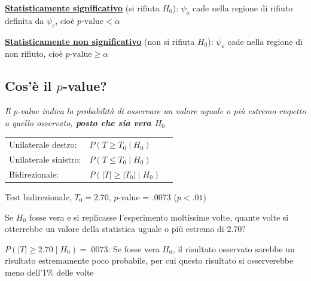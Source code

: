 \documentclass[
  ignorenonframetext,
  compress, aspectratio=149]{beamer}
\begin{document}
\begin{frame}{}
\begin{tcolorbox}
\textbf{\underline{Statisticamente significativo}} (si rifiuta \(H_0\)):
\(\psi_o\) cade nella regione di rifiuto definita da \(\psi_c\), cioè
\(p\text{-value} < \alpha\)

\textbf{\underline{Statisticamente non significativo}} (non si rifiuta
\(H_0\)): \(\psi_o\) cade nella regione di non rifiuto, cioè
\(p\text{-value} \geq \alpha\)

\end{tcolorbox}
\end{frame}

\subsection{\texorpdfstring{Cos'è il
\(p\)-value?}{Cos'è il p-value?}}\label{cosuxe8-il-p-value}

\begin{frame}{}
\label{section-25}
\begin{center}
\emph{Il p-value indica la probabilità di osservare un valore uguale o più estremo rispetto a quello osservato, \textbf{posto che sia vera $H_0$}}

\vspace{2mm}

\small
\begin{tabular}{lll}
Unilaterale destro: & $P(T \geq T_0 \mid H_0)$ \\
Unilaterale sinistro: & $P(T \leq T_0 \mid H_0)$ \\
Bidirezionale: & $P(|T| \geq |T_0| \mid H_0)$ \\
\end{tabular}
\end{center}

\begin{tcolorbox}[enhanced jigsaw, opacityback=0, bottomtitle=1mm, bottomrule=.15mm, titlerule=0mm, coltitle=black, toprule=.15mm, breakable, toptitle=1mm, colbacktitle=quarto-callout-note-color!10!white, arc=.35mm, title={Un esempio}, rightrule=.15mm, leftrule=.75mm, opacitybacktitle=0.6, left=2mm, colframe=quarto-callout-note-color-frame, colback=white]

Test bidirezionale, \(T_0 = 2.70\), \(p\)-value = \(.0073\)
(\(p < .01\))

Se \(H_0\) fosse vera e si replicasse l'esperimento moltissime volte,
quante volte si otterrebbe un valore della statistica uguale o più
estremo di \(2.70\)?

\(P(|T| \geq 2.70 \mid H_0) = .0073\): Se fosse vera \(H_0\), il
risultato osservato sarebbe un risultato estremamente poco probabile,
per cui questo risultato si osserverebbe meno dell'1\% delle volte

\end{tcolorbox}
\end{frame}
\end{document}
